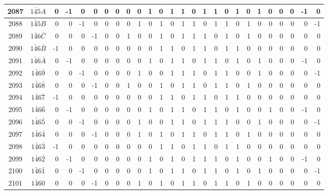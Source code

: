 \documentclass[12 pt]{article}%
\begin{document}
\begin{tiny}
\begin{centering}
\begin{longtable}{|c|c||rrrrrrrrrrrrrrrrrrrrrrrr|}
      \hline
      2087 & $1\bar45A$ & 0 & -1 & 0 & 0 & 0 & 0 & 0 & 0 & 1 & 0 & 1 & 1 & 0 & 1 & 1 & 0 & 1 & 0 & 1 & 0 & 0 & 0 & -1 & 0 \\
      \hline
      2088 & $1\bar45B$ & 0 & 0 & -1 & 0 & 0 & 0 & 0 & 1 & 0 & 1 & 0 & 1 & 1 & 0 & 1 & 1 & 0 & 1 & 0 & 0 & 0 & 0 & 0 & -1 \\
      \hline
      2089 & $1\bar46\bar C$ & 0 & 0 & 0 & -1 & 0 & 0 & 1 & 0 & 0 & 1 & 0 & 1 & 1 & 1 & 0 & 1 & 0 & 1 & 0 & 0 & 0 & 0 & 0 & 0 \\
      \hline
      2090 & $1\bar46\bar B$ & -1 & 0 & 0 & 0 & 0 & 0 & 0 & 0 & 0 & 1 & 1 & 0 & 1 & 1 & 0 & 1 & 1 & 0 & 0 & 0 & 0 & 0 & 0 & 0 \\
      \hline
      2091 & $1\bar46\bar A$ & 0 & -1 & 0 & 0 & 0 & 0 & 0 & 0 & 1 & 0 & 1 & 1 & 0 & 1 & 1 & 0 & 1 & 0 & 1 & 0 & 0 & 0 & -1 & 0 \\
      \hline
      2092 & $1\bar46\bar9$ & 0 & 0 & -1 & 0 & 0 & 0 & 0 & 1 & 0 & 0 & 1 & 1 & 1 & 0 & 1 & 1 & 0 & 0 & 1 & 0 & 0 & 0 & 0 & -1 \\
      \hline
      2093 & $1\bar46\bar8$ & 0 & 0 & 0 & -1 & 0 & 0 & 1 & 0 & 0 & 1 & 0 & 1 & 1 & 0 & 1 & 1 & 0 & 1 & 0 & 0 & 0 & 0 & 0 & 0 \\
      \hline
      2094 & $1\bar46\bar7$ & -1 & 0 & 0 & 0 & 0 & 0 & 0 & 0 & 0 & 1 & 1 & 0 & 1 & 1 & 0 & 1 & 1 & 0 & 0 & 0 & 0 & 0 & 0 & 0 \\
      \hline
      2095 & $1\bar46\bar6$ & 0 & -1 & 0 & 0 & 0 & 0 & 0 & 0 & 1 & 0 & 1 & 1 & 0 & 1 & 1 & 0 & 1 & 0 & 0 & 1 & 0 & 0 & -1 & 0 \\
      \hline
      2096 & $1\bar46\bar5$ & 0 & 0 & -1 & 0 & 0 & 0 & 0 & 1 & 0 & 0 & 1 & 1 & 0 & 1 & 1 & 1 & 0 & 0 & 1 & 0 & 0 & 0 & 0 & -1 \\
      \hline
      2097 & $1\bar46\bar4$ & 0 & 0 & 0 & -1 & 0 & 0 & 0 & 1 & 0 & 1 & 0 & 1 & 1 & 0 & 1 & 1 & 0 & 1 & 0 & 0 & 0 & 0 & 0 & 0 \\
      \hline
      2098 & $1\bar46\bar3$ & -1 & 0 & 0 & 0 & 0 & 0 & 0 & 0 & 0 & 1 & 1 & 0 & 1 & 1 & 0 & 1 & 1 & 0 & 0 & 0 & 0 & 0 & 0 & 0 \\
      \hline
      2099 & $1\bar46\bar2$ & 0 & -1 & 0 & 0 & 0 & 0 & 0 & 0 & 1 & 0 & 1 & 0 & 1 & 1 & 1 & 0 & 1 & 0 & 0 & 1 & 0 & 0 & -1 & 0 \\
      \hline
      2100 & $1\bar46\bar1$ & 0 & 0 & -1 & 0 & 0 & 0 & 0 & 0 & 1 & 0 & 1 & 1 & 0 & 1 & 1 & 0 & 1 & 0 & 1 & 0 & 0 & 0 & 0 & -1 \\
      \hline
      2101 & $1\bar460$ & 0 & 0 & 0 & -1 & 0 & 0 & 0 & 1 & 0 & 1 & 0 & 1 & 1 & 0 & 1 & 1 & 0 & 1 & 0 & 0 & 0 & 0 & 0 & 0 \\

\end{longtable}
\end{centering}
\end{tiny}
\end{document}
